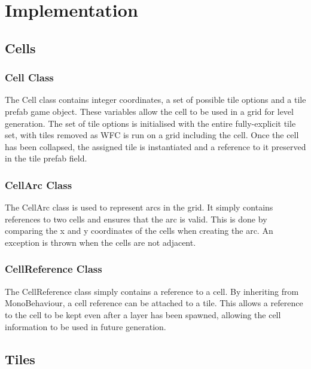 \chapter{Implementation}
\section{Cells}
\subsection{Cell Class}
The Cell class contains integer coordinates, a set of possible tile options and a tile prefab game object. These variables allow the cell to be used in a grid for level generation. The set of tile options is initialised with the entire fully-explicit tile set, with tiles removed as WFC is run on a grid including the cell. Once the cell has been collapsed, the assigned tile is instantiated and a reference to it preserved in the tile prefab field.

\subsection{CellArc Class}
The CellArc class is used to represent arcs in the grid. It simply contains references to two cells and ensures that the arc is valid. This is done by comparing the x and y coordinates of the cells when creating the arc. An exception is thrown when the cells are not adjacent.

\subsection{CellReference Class}
The CellReference class simply contains a reference to a cell. By inheriting from MonoBehaviour, a cell reference can be attached to a tile. This allows a reference to the cell to be kept even after a layer has been spawned, allowing the cell information to be used in future generation.

\section{Tiles}
